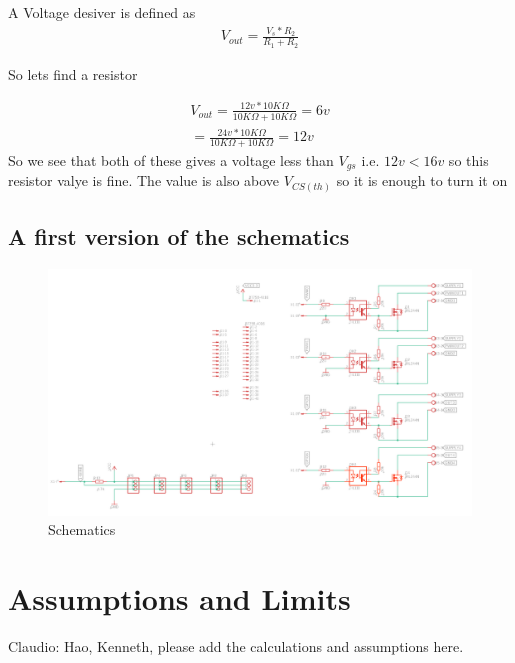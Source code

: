\documentclass{article}
\begin{document}
A Voltage desiver is defined as
 \begin{equation}
 \begin{multlined}
V_{out} = \frac{V_s * R_2}{R_1+R_2}
\end{multlined}
\end{equation}

So lets find a resistor

 \begin{equation}
 \begin{multlined}
V_{out} = \frac{12v * 10K\Omega}{10K\Omega+10K\Omega} = 6v \\
 = \frac{24v * 10K\Omega}{10K\Omega+10K\Omega} = 12v 
\end{multlined}
\end{equation}
So we see that both of these gives a voltage less than $V_{gs}$ i.e. $12v < 16v$ so this resistor valye is fine. The value is also above $V_{CS(th)}$ so it is enough to turn it on


\subsection{A first version of the schematics}

\begin{figure}[!hpt]
\centering
\includegraphics[scale=0.2]{schematics.png}

\caption{Schematics}
\label{fig:schematics}
\end{figure}


\section{Assumptions and Limits}

Claudio: Hao, Kenneth, please add the calculations and assumptions here.
\end{document}
